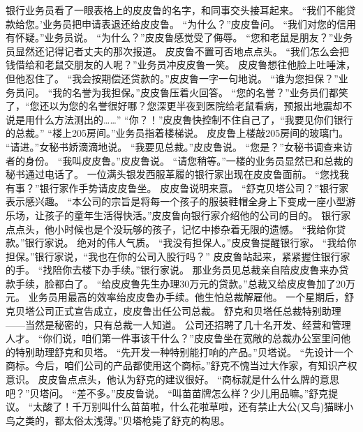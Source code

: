 \documentclass[a4paper,12pt,UTF8,twoside]{ctexbook}
\begin{document}
        银行业务员看了一眼表格上的皮皮鲁的名字，和同事交头接耳起来。 
        “我们不能贷款给您。’业务员把申请表退还给皮皮鲁。 
        “为什么？”皮皮鲁问。 
        “我们对您的信用有怀疑。”业务员说。 
        “为什么？”皮皮鲁感觉受了侮辱。 
        “您和老鼠是朋友？”业务员显然还记得记者丈夫的那次报道。 
        皮皮鲁不置可否地点点头。 
        “我们怎么会把钱借给和老鼠交朋友的人呢？”业务员冲皮皮鲁一笑。 
        皮皮鲁想往他脸上吐唾沫，但他忍住了。 
        “我会按期偿还贷款的。”皮皮鲁一字一句地说。 
        “谁为您担保？”业务员问。 
        “我的名誉为我担保。”皮皮鲁压着火回答。 
        “您的名誉？”业务员们都笑了，“您还以为您的名誉很好哪？您深更半夜到医院给老鼠看病，预报出地震却不说是用什么方法测出的……” 
        “你？！”皮皮鲁快控制不住自己了，“我要见你们银行的总裁。” 
        “楼上205房间。”业务员指着楼梯说。 
        皮皮鲁上楼敲205房间的玻璃门。 
        “请进。”女秘书娇滴滴地说。 
        “我要见总裁。”皮皮鲁说。 
        “您是？”女秘书调查来访者的身份。 
        “我叫皮皮鲁。”皮皮鲁说。 
        “请您稍等。”一楼的业务员显然已和总裁的秘书通过电话了。 
        一位满头银发西服革履的银行家出现在皮皮鲁面前。 
        “您找我有事？”银行家作手势请皮皮鲁坐。 
        皮皮鲁说明来意。 
        “舒克贝塔公司？”银行家表示感兴趣。 
        “本公司的宗旨是将每一个孩子的服装鞋帽全身上下变成一座小型游乐场，让孩子的童年生活得快活。”皮皮鲁向银行家介绍他的公司的目的。 
        银行家点点头，他小时候也是个没玩够的孩子，记忆中掺杂着无限的遗憾。 
        “我给你贷款。”银行家说。 
        绝对的伟人气质。 
        “我没有担保人。”皮皮鲁提醒银行家。 
        “我给你担保。”银行家说，“我也在你的公司入股行吗？” 
        皮皮鲁站起来，紧紧握住银行家的手。 
        “找陪你去楼下办手续。”银行家说。 
        那业务员见总裁亲自陪皮皮鲁来办贷款手续，脸都白了。 
        “给皮皮鲁先生办理30万元的贷款。”总裁又给皮皮鲁加了20万元。 
        业务员用最高的效率绐皮皮鲁办手续。他生怕总裁解雇他。 
        一个星期后，舒克贝塔公司正式宣告成立，皮皮鲁出任公司总裁。 
        舒克和贝塔任总裁特别助理——当然是秘密的，只有总裁一人知道。 
        公司还招聘了几十名开发、经营和管理人才。 
        “你们说，咱们第一件事该干什么？”皮皮鲁坐在宽敞的总裁办公室里问他的特别助理舒克和贝塔。 
        “先开发一种特别能打响的产品。”贝塔说。 
        “先设计一个商标。今后，咱们公司的产品都使用这个商标。”舒克不愧当过大作家，有知识产权意识。 
        皮皮鲁点点头，他认为舒克的建议很好。 
        “商标就是什么什么牌的意思吧？”贝塔问。 
        “差不多。”皮皮鲁说。 
        “叫苗苗牌怎么样？少儿用品嘛。”舒克提议。 
        “太酸了！千万别叫什么苗苗啦，什么花啦草啦，还有禁止大公(又鸟)猫眯小鸟之类的，都太俗太浅薄。”贝塔枪毙了舒克的构思。 
\end{document}

